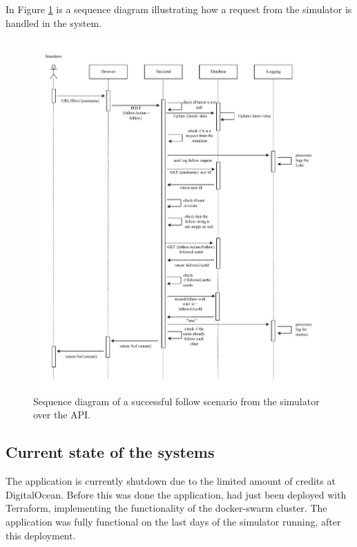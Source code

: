 In Figure \ref{fig:apicontroller} is a sequence diagram illustrating how a request from the simulator is handled in the system.\newline

\begin{figure}[H]
  \begin{center}
\includegraphics[width=\textwidth]{images/figures/Sequence-api.pdf}
    \caption{Sequence diagram of a successful follow scenario from the simulator over the API.}
    \label{fig:apicontroller}
  \end{center}
\end{figure}


\subsection{Current state of the systems}
The application is currently shutdown due to the limited amount of credits at DigitalOcean. 
Before this was done the application, had just been deployed with Terraform, implementing the functionality of the docker-swarm cluster. The application was fully functional on the last days of the simulator running, after this deployment.\newline

